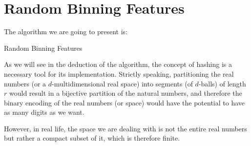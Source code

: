 
\section{Random Binning Features}  

The algorithm we are going to present is: 

\begin{algorithm}[hbt!]
    \caption{Random Binning Features}\label{alg:RandomBinning Features}
    \end{algorithm}

    As we will see in the deduction of the algorithm, the concept of hashing is a 
    necessary tool for its implementation. Strictly speaking, partitioning the real 
    numbers (or a $d$-multidimensional real space) into segments (of $d$-balls) of length $r$ would result in a bijective partition of the natural numbers, and therefore the binary encoding of the real numbers (or space) would have 
    the potential to have as many digits as we want.

    However, in real life, the space we are dealing with is not 
    the entire real numbers but rather a compact subset of it, which is therefore finite.
    
